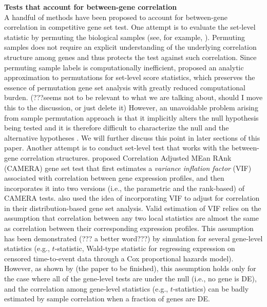 \documentclass[useAMS,usenatbib, galley]{biom}
\begin{document}
	\textbf{Tests that account for between-gene correlation}\\
	A handful of methods have been proposed to account for between-gene correlation in competitive gene set test. One attempt is to evaluate the set-level statistic by permuting the biological samples (see, for example, \cite{subramanian2005gene, efron2007testing}). Permuting samples does not require an explicit understanding of the underlying correlation structure among genes and thus protects the test against such correlation. Since permuting sample labels is computationally inefficient, \cite{zhou2013empirical} proposed an analytic approximation to permutations for set-level score statistics, which preserves the essence of permutation gene set analysis with greatly reduced computational burden. (???seems not to be relevant to what we are talking about, should I move this to the discussion, or just delete it)  However, an unavoidable problem arising from sample permutation approach is that it implicitly alters the null hypothesis being tested and it is therefore difficult to characterize the null and the alternative hypotheses \citep{goeman2007analyzing, khatri2012ten, wu2012camera}. We will further discuss this point in later sections of this paper. Another attempt is to conduct set-level test that works with the between-gene correlation structures. \cite{wu2012camera} proposed Correlation Adjusted MEan RAnk (CAMERA) gene set test that first estimates a \textit{variance inflation factor} (VIF) associated with correlation between gene expression profiles, and then incorporates it into two versions (i.e., the parametric and the rank-based) of CAMERA tests. \cite{yaari2013quantitative} also used the idea of incorporating VIF to adjust for correlation in their distribution-based gene set analysis. Valid estimation of VIF relies on the assumption that correlation between any two local statistics are almost the same as correlation between their corresponding expression profiles. This assumption has been demonstrated (??? a better word???) by simulation \citep{barry2008statistical} for several gene-level statistics (e.g., $t$-statistic, Wald-type statistic for regressing expression on censored time-to-event data through a Cox proportional hazards model). However, as shown by (the paper to be finished), this assumption holds only for the case where all of the gene-level tests are under the null (i.e., no gene is DE), and the correlation among gene-level statistics (e.g., $t$-statistics) can be badly estimated by sample correlation when a fraction of genes are DE. 
	
\end{document}
